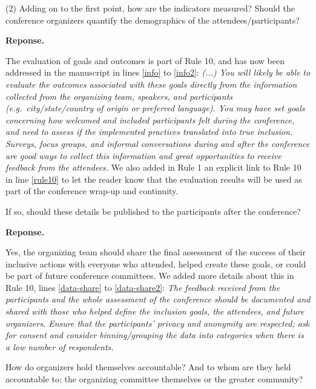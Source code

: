 \documentclass{article}
\newenvironment{Reply}{\noindent\color{BlueViolet}\textbf{Reponse.}}{\vspace{1em}}
\begin{document}
(2) Adding on to the first point, how are the indicators measured? Should the conference organizers quantify the demographics of the attendees/participants? 

\begin{Reply}

The evaluation of goals and outcomes is part of Rule 10, and has now been addressed in the manuscript in lines \ref{info} to \ref{info2}:
\textit{
(...) You will likely be able to evaluate the outcomes associated with these goals directly from the information collected from the organizing team, speakers, and participants (e.g.\ city/state/country of origin or preferred language).
You may have set goals concerning how welcomed and included participants felt during the conference, and need to assess if the implemented practices translated into true inclusion. 
Surveys, focus groups, and informal conversations during and after the conference are good ways to collect this information and great opportunities to receive feedback from the attendees.
}
We also added in Rule 1 an explicit link to Rule 10 in line \ref{rule10} to let the reader know that the evaluation results will be used as part of the conference wrap-up and continuity. 

\end{Reply}



If so, should these details be published to the participants after the conference? 

\begin{Reply}

Yes, the organizing team should share the final assessment of the success of their inclusive actions with everyone who attended, helped create these goals, or could be part of future conference committees. 
We added more details about this in Rule 10, lines \ref{data-share} to \ref{data-share2}:
\textit{The feedback received from the participants and the whole assessment of the conference should be documented and shared with those who helped define the inclusion goals, the attendees, and future organizers. 
Ensure that the participants' privacy and anonymity are respected; ask for consent and consider binning/grouping the data into categories when there is a low number of respondents.}
\end{Reply}

How do organizers hold themselves accountable? And to whom are they held accountable to; the organizing committee themselves or the greater community?
\end{document}
